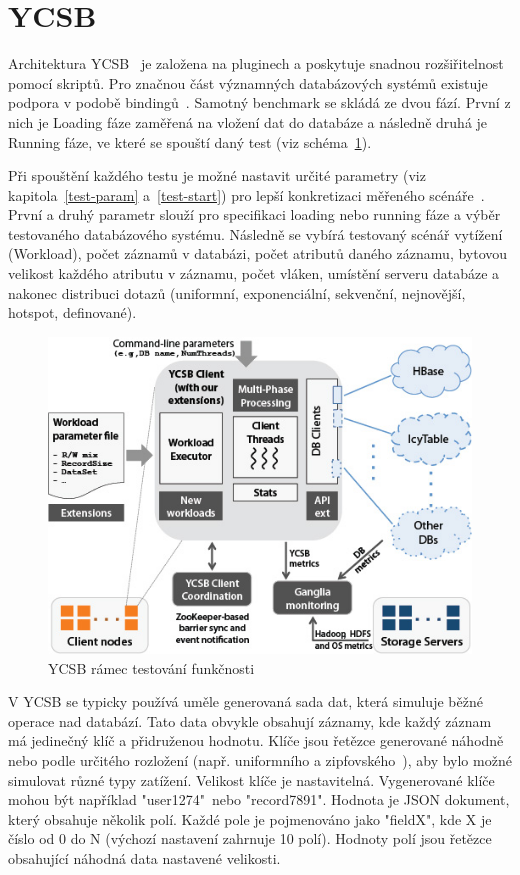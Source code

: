 \documentclass[czech,master,dept460,male,csharp,cpdeclaration]{diploma}
\begin{document}
	\section{YCSB} \label{lab-ycsb}
	
	Architektura YCSB~\cite{ycsb,ycsb-benchmarking} je založena na pluginech a poskytuje snadnou rozšiřitelnost pomocí skriptů. Pro značnou část významných databázových systémů existuje podpora v podobě bindingů~\cite{ycsb}. Samotný benchmark se skládá ze dvou fází. První z nich je Loading fáze zaměřená na vložení dat do databáze a následně druhá je Running fáze, ve které se spouští daný test (viz schéma~\ref{ycsb-blok-schema}).
	
	Při spouštění každého testu je možné nastavit určité parametry (viz kapitola~\ref{test-param} a~\ref{test-start}) pro lepší konkretizaci měřeného scénáře~\cite{ytb-ycsb}. První a druhý parametr slouží pro specifikaci loading nebo running fáze a výběr testovaného databázového systému. Následně se vybírá testovaný scénář vytížení (Workload), počet záznamů v databázi, počet atributů daného záznamu, bytovou velikost každého atributu v záznamu, počet vláken, umístění serveru databáze a nakonec distribuci dotazů (uniformní, exponenciální, sekvenční, nejnovější, hotspot, definované).
	
	\begin{figure}
		\centering
		\includegraphics[scale=0.85]{Data/ycsb-1.jpg}
		\caption{YCSB rámec testování funkčnosti \cite{ycsb-parallel-data-lab}\label{ycsb-blok-schema}}
	\end{figure}
	
	V YCSB se typicky používá uměle generovaná sada dat, která simuluje běžné operace nad databází. Tato data obvykle obsahují záznamy, kde každý záznam má jedinečný klíč a přidruženou hodnotu. Klíče jsou řetězce generované náhodně nebo podle určitého rozložení (např. uniformního a zipfovského~\cite{zipf-dist}), aby bylo možné simulovat různé typy zatížení. Velikost klíče je nastavitelná. Vygenerované klíče mohou být například "user1274"~nebo "record7891". Hodnota je JSON dokument, který obsahuje několik polí. Každé pole je pojmenováno jako "fieldX", kde X je číslo od 0 do N (výchozí nastavení zahrnuje 10 polí). Hodnoty polí jsou řetězce obsahující náhodná data nastavené velikosti.
	
\end{document}
